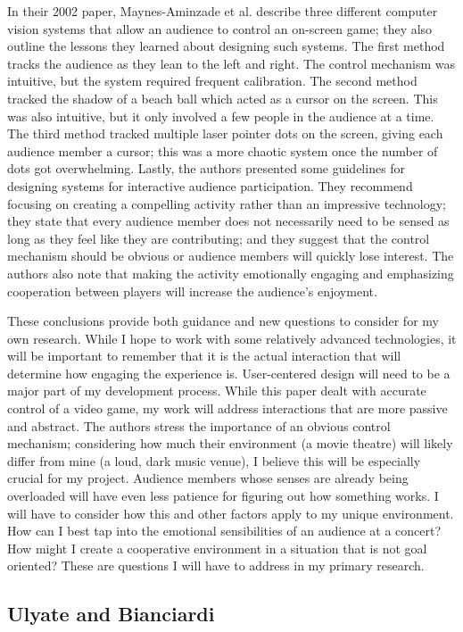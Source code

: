 In their 2002 paper, Maynes-Aminzade et al. describe three different computer vision systems that allow an audience to control an on-screen game; they also outline the lessons they learned about designing such systems. The first method tracks the audience as they lean to the left and right. The control mechanism was intuitive, but the system required frequent calibration. The second method tracked the shadow of a beach ball which acted as a cursor on the screen. This was also intuitive, but it only involved a few people in the audience at a time. The third method tracked multiple laser pointer dots on the screen, giving each audience member a cursor; this was a more chaotic system once the number of dots got overwhelming. Lastly, the authors presented some guidelines for designing systems for interactive audience participation. They recommend focusing on creating a compelling activity rather than an impressive technology; they state that every audience member does not necessarily need to be sensed as long as they feel like they are contributing; and they suggest that the control mechanism should be obvious or audience members will quickly lose interest. The authors also note that making the activity emotionally engaging and emphasizing cooperation between players will increase the audience's enjoyment.

These conclusions provide both guidance and new questions to consider for my own research. While I hope to work with some relatively advanced technologies, it will be important to remember that it is the actual interaction that will determine how engaging the experience is. User-centered design will need to be a major part of my development process. While this paper dealt with accurate control of a video game, my work will address interactions that are more passive and abstract. The authors stress the importance of an obvious control mechanism; considering how much their environment (a movie theatre) will likely differ from mine (a loud, dark music venue), I believe this will be especially crucial for my project. Audience members whose senses are already being overloaded will have even less patience for figuring out how something works. I will have to consider how this and other factors apply to my unique environment. How can I best tap into the emotional sensibilities of an audience at a concert? How might I create a cooperative environment in a situation that is not goal oriented? These are questions I will have to address in my primary research.

\subsection{Ulyate and Bianciardi}

